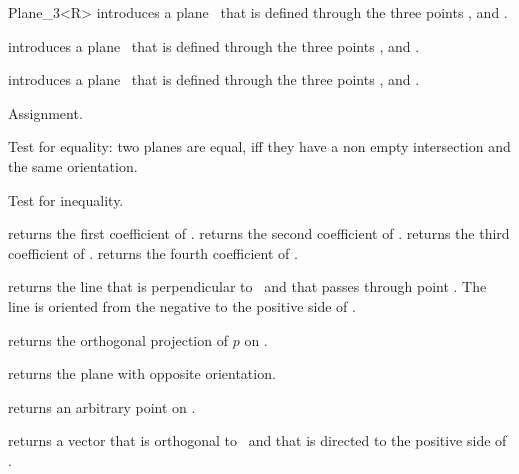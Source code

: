 \begin{ccRefClass} {Plane_3<R>}
{introduces a plane \ccVar\ that is defined through the  three points 
 ,  and .}

{introduces a plane \ccVar\ that is defined through the  three points 
 ,  and .}

{introduces a plane \ccVar\ that is defined through the  three points 
 ,  and .}

\ccOperations
\ccHidden {}
        {Assignment.}

       {Test for equality: two planes are equal, iff they have a non 
        empty intersection and the same orientation.}

       {Test for inequality.}

       {returns the first coefficient of \ccVar.}
\ccGlue
{}
       {returns the second coefficient of \ccVar.}
\ccGlue
{}
       {returns the third coefficient of \ccVar.}
\ccGlue
{}
       {returns the fourth coefficient of \ccVar.}

       {returns the line that is perpendicular to \ccVar\ and that
        passes through point . The line is oriented from
        the negative to the positive side of \ccVar.}

       {returns the orthogonal projection of $p$ on \ccVar.}

       {returns the plane with opposite orientation.}

       {returns an arbitrary point on \ccVar.}

       {returns a vector that is orthogonal to \ccVar\ and that
        is directed to the positive side of \ccVar.}


\end{ccRefClass}
